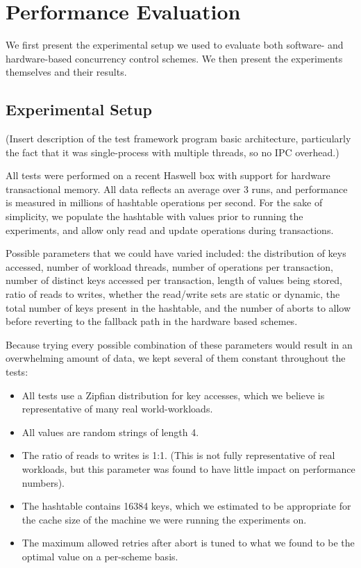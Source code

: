 \section{Performance Evaluation} \label{sec:eval}
We first present the experimental setup we used to evaluate both software- and hardware-based concurrency control schemes. We then present the experiments themselves and their results.

\subsection{Experimental Setup}
(Insert description of the test framework program basic architecture,
particularly the fact that it was single-process with multiple threads, so no
IPC overhead.)

All tests were performed on a recent Haswell box with support for hardware
transactional memory. All data reflects an average over 3 runs, and
performance is measured in millions of hashtable operations per second. For the
sake of simplicity, we populate the hashtable with values prior to running the
experiments, and allow only read and update operations during transactions.

Possible parameters that we could have varied included: the distribution of keys
accessed, number of workload threads, number of operations per transaction,
number of distinct keys accessed per transaction, length of values being stored,
ratio of reads to writes, whether the read/write sets are static or dynamic, the
total number of keys present in the hashtable, and the number of aborts to allow
before reverting to the fallback path in the hardware based schemes.

Because trying every possible combination of these parameters would result in 
an overwhelming amount of data, we kept several of them constant throughout the 
tests:
\begin{itemize}
\item All tests use a Zipfian distribution for key accesses, which we believe is
  representative of many real world-workloads.
\item All values are random strings of length 4.
\item The ratio of reads to writes is 1:1. (This is not fully representative of
  real workloads, but this parameter was found to have little impact on
  performance numbers).
\item The hashtable contains 16384 keys, which we estimated to be appropriate
  for the cache size of the machine we were running the experiments on.
\item The maximum allowed retries after abort is tuned to what we found to be
  the optimal value on a per-scheme basis.
\end{itemize}

